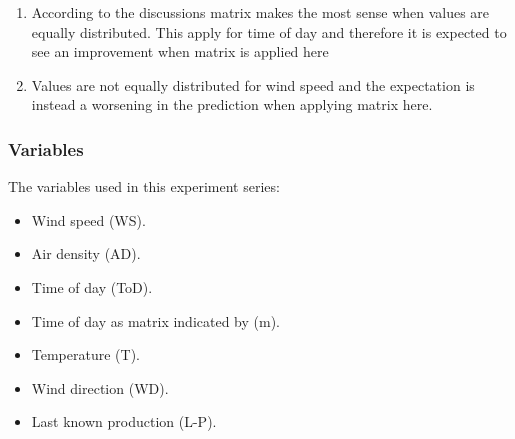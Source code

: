 \begin{enumerate}
\item According to the discussions matrix makes the most sense when values are equally distributed. This apply for time of day and therefore it is expected to see an improvement when matrix is applied here
\item Values are not equally distributed for wind speed and the expectation is instead a worsening in the prediction when applying matrix here.
\end{enumerate}

\subsubsection{Variables}
The variables used in this experiment series:

\begin{itemize}
\item Wind speed (WS).
\item Air density (AD).
\item Time of day (ToD).
\item Time of day as matrix indicated by (m).
\item Temperature (T).
\item Wind direction (WD).
\item Last known production (L-P).
\end{itemize}

